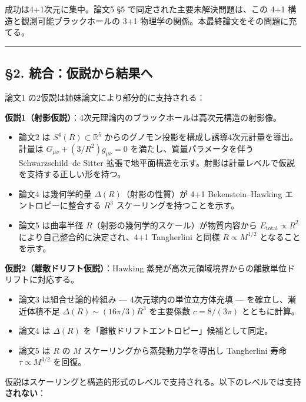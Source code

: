 \documentclass[a4paper,11pt]{ltjsarticle}
\theoremstyle{definition}
\providecommand{\tightlist}{\setlength{\itemsep}{0pt}\setlength{\parskip}{0pt}}
\begin{document}
成功は4+1次元に集中。論文5 §5 で同定された主要未解決問題は、この 4+1
構造と観測可能ブラックホールの 3+1
物理学の関係。本最終論文をその問題に充てる。

\begin{center}\rule{0.5\linewidth}{0.5pt}\end{center}

\subsection{§2.
統合：仮説から結果へ}\label{ux7d71ux5408ux4eeeux8aacux304bux3089ux7d50ux679cux3078}

論文1 の2仮説は姉妹論文により部分的に支持される：

\textbf{仮説1（射影仮説）}：4次元理論内のブラックホールは高次元構造の射影像。

\begin{itemize}
\tightlist
\item
  論文2 は \(S^4(R) \subset \mathbb{R}^5\)
  からのグノモン投影を構成し誘導4次元計量を導出。計量は
  \(G_{\mu\nu} + (3/R^2) g_{\mu\nu} = 0\) を満たし、質量パラメータを伴う
  Schwarzschild--de Sitter
  拡張で地平面構造を示す。射影は計量レベルで仮説を支持する正しい形を持つ。
\item
  論文4 は幾何学的量 \(\Delta(R)\)（射影の性質）が 4+1
  Bekenstein--Hawking エントロピーに整合する \(R^3\)
  スケーリングを持つことを示す。
\item
  論文5 は曲率半径 \(R\)（射影の幾何学的スケール）が物質内容から
  \(E_{\mathrm{total}} \propto R^2\) により自己整合的に決定され、4+1
  Tangherlini と同様 \(R \propto M^{1/2}\) となることを示す。
\end{itemize}

\textbf{仮説2（離散ドリフト仮説）}：Hawking
蒸発が高次元領域境界からの離散単位ドリフトに対応する。

\begin{itemize}
\tightlist
\item
  論文3 は組合せ論的枠組み --- 4次元球内の単位立方体充填 ---
  を確立し、漸近体積不足 \(\Delta(R) \sim (16\pi/3) R^3\) を主要係数
  \(c = 8/(3\pi)\) とともに計算。
\item
  論文4 は \(\Delta(R)\) を「離散ドリフトエントロピー」候補として同定。
\item
  論文5 は \(R\) の \(M\) スケーリングから蒸発動力学を導出し Tangherlini
  寿命 \(\tau \propto M^{3/2}\) を回復。
\end{itemize}

仮説はスケーリングと構造的形式のレベルで支持される。以下のレベルでは支持\textbf{されない}：
\end{document}
